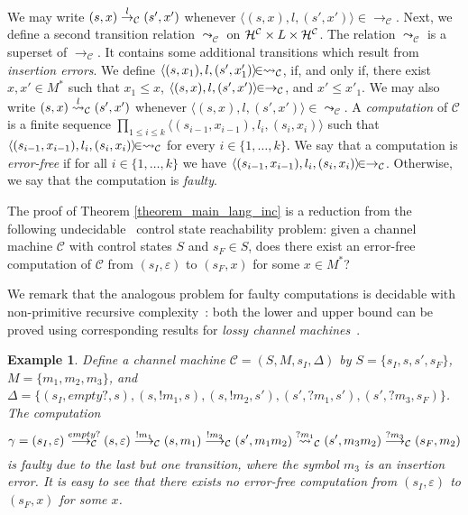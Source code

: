 \documentclass{CSML}
\theoremstyle{plain}\newtheorem{theorem}[thm]{Theorem}
\theoremstyle{plain}\newtheorem{corollary}[thm]{Corollary}
\theoremstyle{plain}\newtheorem{example}[thm]{Example}
\theoremstyle{plain}\newtheorem{lemma}[thm]{Lemma}
\theoremstyle{plain}\newtheorem{remark}[thm]{Remark}
\newcommand{\cm}{\mathcal{C}}
\begin{document}
We may write $(s,x)\buildrel l\over\to_\cm (s',x')$ whenever $\langle(s,x),l,(s',x')\rangle\in\to_\cm$.
Next, we define a second transition relation $\leadsto_\cm$  on $\hs^\cm\times L\times\hs^\cm$. The relation $\leadsto_\cm$ is a superset of $\to_\cm$. It contains some additional transitions which result from \emph{insertion errors}. We define $\langle (s,x_1),l,(s',x'_1)\rangle\hspace{-1.6mm}\in\leadsto_\cm$, if, and only if, there exist $x,x'\in M^*$ such that $x_1\leq x$, $\langle (s,x), l,(s',x')\rangle\hspace{-1.3mm}\in\to_\cm$, and $x'\leq x'_1$.
We may also write $(s,x)\buildrel l \over\leadsto_\cm(s',x')$ whenever $\langle(s,x),l,(s',x')\rangle\in\leadsto_\cm$. 
A \emph{computation} of $\cm$ is a finite sequence $\prod_{1\leq i\leq k} \langle (s_{i-1},x_{i-1}),l_i,(s_i,x_i)\rangle$ such that $\langle (s_{i-1},x_{i-1}),l_i,(s_i,x_i)\rangle\hspace{-1.6mm}\in\leadsto_\cm$ for every $i\in\{1,\dots,k\}$. 
We say that a computation is \emph{error-free} if for all $i\in\{1,\dots,k\}$ we have $\langle (s_{i-1},x_{i-1}),l_i,(s_i,x_i)\rangle\hspace{-1.6mm}\in\to_\cm$.
Otherwise, we say that the computation is \emph{faulty}.

The proof of Theorem \ref{theorem_main_lang_inc}  is a reduction from the following undecidable~\cite{Brand:1983:CFM:322374.322380} control state reachability problem: given a channel machine $\cm$ with control states $S$ and $s_F\in S$, does there exist an error-free computation of $\cm$ from $(s_I,\varepsilon)$ to $(s_F,x)$ for some $x\in M^*$?



We remark that the analogous problem for faulty computations is decidable with non-primitive recursive complexity~\cite{DBLP:journals/fuin/AbdullaDOQW08}: both the lower and upper bound can be proved using corresponding results for \emph{lossy channel machines}~\cite{DBLP:journals/tcs/AbdullaJ03,DBLP:journals/ipl/Schnoebelen02}.

\begin{example}
	\label{example_encoding}
	Define a channel machine $\cm=(S,M,s_I,\Delta)$ by $S=\{s_I,s,s',s_F\}$, $M=\{m_1,m_2,m_3\}$, and $\Delta=\{(s_I,empty?,s),(s,!m_1,s),(s,!m_2,s'),(s',?m_1,s'),(s',?m_3,s_F)\}$. 
	The computation	
	$$\gamma = 
	(s_I,\varepsilon)\buildrel empty?\over {\longrightarrow_\cm}  (s,\varepsilon) \buildrel !m_1 \over \longrightarrow_\cm
	(s,m_1)\buildrel !m_2\over \longrightarrow_\cm
	(s',m_1m_2)\buildrel ?m_1\over\leadsto_\cm
	(s',m_3m_2)\buildrel ?m_3\over\longrightarrow_\cm (s_F,m_2)$$ 
	is faulty due to the last but one transition, where the symbol $m_3$ is an insertion error. 	
	It is easy to see that there exists no error-free computation from $(s_I,\varepsilon)$ to $(s_F,x)$ for some $x$. 
\end{example}
\end{document}
